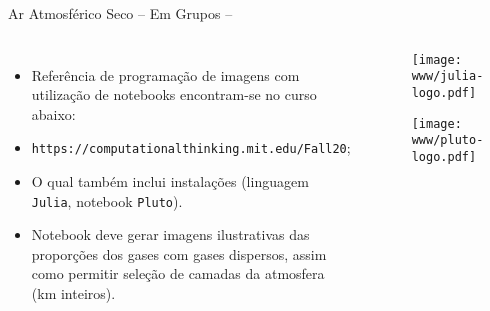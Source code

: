 \begin{frame}[allowframebreaks]{Ar Atmosférico Seco -- Em Grupos -- }
        \pagebreak

        \begin{columns}
            \begin{itemize}
                \item Referência de programação de \alert{imagens} com utilização de
                    \alert{notebooks} encontram-se no curso abaixo:
                \item {\scriptsize\tt https://computationalthinking.mit.edu/Fall20};
                \item O qual também inclui \alert{instalações} (linguagem {\tt Julia}, notebook
                    {\tt Pluto}).
                \item Notebook deve gerar imagens ilustrativas das proporções dos gases com
                    gases \alert{dispersos}, assim como permitir \alert{seleção de camadas} da
                    atmosfera (km inteiros).
            \end{itemize}
            \begin{center}
                \begin{figure}
                    \fontsize{3.0}{4}\selectfont
                    \texttt{[image: www/julia-logo.pdf]}
                    \\\vspace*{-2.5em}
                \end{figure}
                \begin{figure}
                    \fontsize{3.0}{4}\selectfont
                    \texttt{[image: www/pluto-logo.pdf]}
                    \\\vspace*{-2.5em}
                \end{figure}
            \end{center}
        \end{columns}

    \end{frame}

    {
        \usebackgroundtemplate{\mbox{~}}
    }





